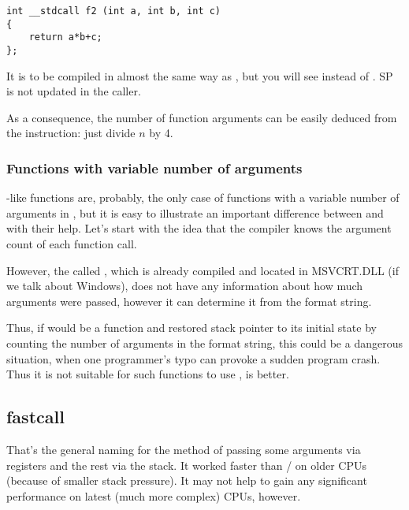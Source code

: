 \begin{lstlisting}[style=customc]
int __stdcall f2 (int a, int b, int c)
{
	return a*b+c;
};
\end{lstlisting}

It is to be compiled in almost the same way as , but you will see  instead of .
\ac{SP} is not updated in the \gls{caller}.

As a consequence, 
the number of function arguments can be easily deduced from the  instruction: just divide $n$ by 4.



\subsubsection{Functions with variable number of arguments}

\printf-like functions are, probably, the only case of functions with a variable number of arguments in \CCpp,
but it is easy to illustrate an important difference between  and  with their help.
Let's start with the idea that the compiler knows the argument count of each \printf function call.

However, the called \printf, which is already compiled and located in MSVCRT.DLL (if we talk about Windows),
does not have any information about how much arguments were passed, however it can determine it from the format string.

Thus, if \printf would be a  function and restored \gls{stack pointer} to its initial state by counting
the number of arguments in the format string, this could be a dangerous situation, when one programmer's typo can
provoke a sudden program crash.
Thus it is not suitable for such functions to use ,  is better.

\subsection{fastcall}
\label{fastcall}

That's the general naming for the method of passing some arguments via registers and the 
rest via the stack. It worked faster than / on older CPUs 
(because of smaller stack pressure).
It may not help to gain any significant performance on latest (much more complex) \ac{CPU}s, however.


